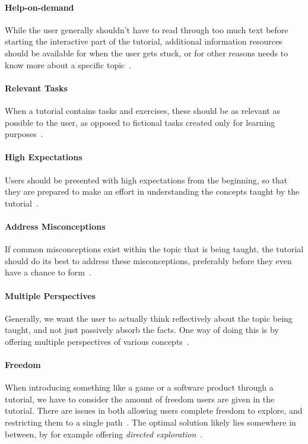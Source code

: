 \paragraph{Help-on-demand} While the user generally shouldn't have to read through too much text before starting the interactive part of the tutorial, additional information resources should be available for when the user gets stuck, or for other reasons needs to know more about a specific topic~\cite{andersen:tutorials_impact, grossman:toolclips}.

\paragraph{Relevant Tasks} When a tutorial contains tasks and exercises, these should be as relevant as possible to the user, as opposed to fictional tasks created only for learning purposes~\cite{kelleher:stencils}.

\paragraph{High Expectations} Users should be presented with high expectations from the beginning, so that they are prepared to make an effort in understanding the concepts taught by the tutorial~\cite{chickering:seven_principles}.

\paragraph{Address Misconceptions} If common misconceptions exist within the topic that is being taught, the tutorial should do its best to address these misconceptions, preferably before they even have a chance to form~\cite{aberson:tutorial_evaluation}.

\paragraph{Multiple Perspectives} Generally, we want the user to actually think reflectively about the topic being taught, and not just passively absorb the facts. One way of doing this is by offering multiple perspectives of various concepts~\cite{aberson:tutorial_evaluation}.

\paragraph{Freedom} When introducing something like a game or a software product through a tutorial, we have to consider the amount of freedom users are given in the tutorial. There are issues in both allowing users complete freedom to explore, and restricting them to a single path~\cite{andersen:tutorials_impact, bonawitz:double_edged_pedagogy}. The optimal solution likely lies somewhere in between, by for example offering \emph{directed exploration}~\cite{esper:codespells}. 

